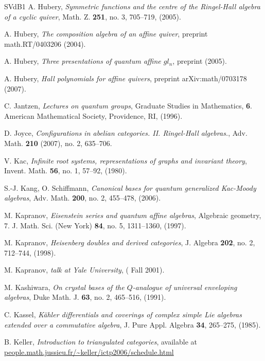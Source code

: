 \documentclass[a4paper,10pt]{amsart}
\numberwithin{equation}{section}
\begin{document}
{{\begin{thebibliography}{SVdB1}
A. Hubery, \emph{Symmetric functions and the centre of the Ringel-Hall algebra of a cyclic quiver}, Math. Z. \textbf{251}, no. 3, 705--719, (2005).

A. Hubery, \emph{The composition algebra of an affine quiver}, preprint math.RT/0403206 (2004).

A. Hubery, \emph{Three presentations of quantum affine $gl_n$}, preprint (2005).

A. Hubery, \emph{Hall polynomials for affine quivers}, preprint arXiv:math/0703178 (2007).

C. Jantzen, \emph{Lectures on quantum groups}, Graduate Studies in Mathematics, \textbf{6}. American Mathematical Society, Providence, RI, (1996).

D. Joyce, \emph{Configurations in abelian categories. II. Ringel-Hall algebras.},
Adv. Math. \textbf{210} (2007), no. 2, 635--706.

V. Kac, \emph{ Infinite root systems, representations of graphs and invariant theory}, Invent. Math. \textbf{56}, no. 1, 57--92, (1980).

S.-J. Kang, O. Schiffmann, \emph{Canonical bases for quantum generalized Kac-Moody algebras}, Adv. Math. \textbf{200}, no. 2, 455--478, (2006).

M. Kapranov, \emph{Eisenstein series and quantum affine algebras},
Algebraic geometry, 7.
J. Math. Sci. (New York) \textbf{84}, no. 5, 1311--1360, (1997).

M. Kapranov, \emph{ Heisenberg doubles and derived categories}, J. Algebra \textbf{202}, no. 2, 712--744, (1998).

M. Kapranov, \emph{talk at Yale University}, ( Fall 2001).

M. Kashiwara, \emph{On crystal bases of the $Q$-analogue of universal enveloping algebras}, Duke Math. J. \textbf{63}, no. 2, 465--516, (1991).

C. Kassel, \emph{K\"ahler differentials and coverings of complex simple Lie algebras extended over a commutative algebra}, J. Pure Appl. Algebra \textbf{34}, 265--275, (1985).

B. Keller, \emph{Introduction to triangulated categories}, available at \url{people.math.jussieu.fr/~keller/ictp2006/schedule.html}


\end{thebibliography}}}
\end{document}

